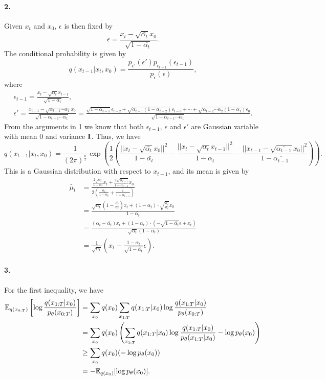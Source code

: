 \documentclass[a4 paper,12pt]{article}
\begin{document}
\paragraph*{2.}
Given $x_t$ and $x_0$, $\epsilon$ is then fixed by
\[
\epsilon=\frac{x_t-\sqrt{\bar{\alpha_t}}x_0}{\sqrt{1-\bar{\alpha_t}}}.	
\] The conditional probability is given by
\[
q(x_{t-1}|x_t,x_0)=\frac{p_{\epsilon'}(\epsilon')p_{\epsilon_{t-1}}(\epsilon_{t-1})}{p_\epsilon(\epsilon)},
\]where
\begin{gather*}
\epsilon_{t-1}=\frac{x_t-\sqrt{\alpha_t}x_{t-1}}{\sqrt{1-\alpha_t}},\\
\epsilon'=\frac{x_{t-1}-\sqrt{\alpha_{t-1}\cdots\alpha_1}x_0}{\sqrt{1-\alpha_{t-1}\cdots\alpha_1}}=\frac{\sqrt{1-\alpha_{t-1}}\epsilon_{t-2}+\sqrt{\alpha_{t-1} (1-\alpha_{t-2})}\epsilon_{t-3}+\cdots+\sqrt{\alpha_{t-2}\cdots\alpha_{2}(1-\alpha_1)}\epsilon_0}{\sqrt{1-\alpha_{t-1}\cdots\alpha_1}}.
\end{gather*} From the arguments in 1 we know that both $\epsilon_{t-1}$, $\epsilon$ and $\epsilon'$ are Gaussian variable with mean 0 and variance $\mathbf{I}$. Thus, we have
\[
q(x_{t-1}|x_t,x_0)=\frac{1}{(2\pi)^{\frac{n}{2}}}\exp\left(\frac{1}{2}\left(\frac{||x_t-\sqrt{\bar{\alpha_t}}x_0||^2}{1-\bar{\alpha_t}}-\frac{||x_t-\sqrt{\alpha_t}x_{t-1}||^2}{1-\alpha_t}-\frac{||x_{t-1}-\sqrt{\overline{\alpha_{t-1}}}x_0||^2}{1-{\overline{\alpha_{t-1}}}}\right)\right).
\] This is a Gaussian distribution with respect to $x_{t-1}$, and its mean is given by
\begin{align*}
\tilde{\mu_t}&=\frac{\frac{2\sqrt{\alpha_t}}{1-\alpha_t}x_t+\frac{2\sqrt{\overline{\alpha_{t-1}}}}{1-\overline{\alpha_{t-1}}}x_0}{2\left(\frac{\alpha_t}{1-\alpha_t}+\frac{1}{1-\overline{\alpha_{t-1}}}\right)}\\
&=\frac{\sqrt{\alpha_t}(1-\frac{\bar{\alpha_t}}{\alpha_t})x_t+(1-\alpha_t)\cdot \sqrt{\frac{\bar{\alpha_t}}{\alpha_t}}x_0}{1-\bar{\alpha_t}}\\
&=\frac{(\alpha_t-{\bar{\alpha_t}})x_t+(1-\alpha_t)\cdot (-\sqrt{1-\bar{\alpha_t}}\epsilon+x_t)}{\sqrt{\alpha_t}(1-\bar{\alpha_t})}\\
&=\frac{1}{\sqrt{\alpha_t}}\left(x_t-\frac{1-\alpha_t}{\sqrt{1-\overline{\alpha_t}}}\epsilon\right).
\end{align*}

\paragraph*{3.}
For the first inequality, we have 
\begin{align*}
\mathbb{E}_{q(x_{0:T})}\left[\log \frac{q(x_{1:T}|x_0)}{p_\theta(x_{0:T})}\right]&=\sum_{x_0}q(x_0)\sum_{x_{1:T}}q(x_{1:T}|x_0)\log \frac{q(x_{1:T}|x_0)}{p_\theta(x_{0:T})}\\
&=\sum_{x_0}q(x_0)\left(\sum_{x_{1:T}}q(x_{1:T}|x_0)\log \frac{q(x_{1:T}|x_0)}{p_\theta(x_{1:T}|x_0)}-\log p_\theta(x_0)\right)\\
&\ge \sum_{x_0}q(x_0)(-\log p_\theta(x_0))\\
&=-\mathbb{E}_{q(x_0)}[\log p_\theta(x_0)].
\end{align*}
\end{document}
